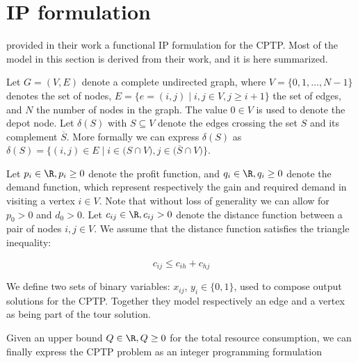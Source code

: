 \chapter{IP formulation}

\cite{Jepsen2014} provided in their work a functional IP formulation for the CPTP.
Most of the model in this section is derived from their work, and it is here summarized.

Let $G = \left(V, E \right)$ denote a complete undirected graph, where $V = \lbrace 0, 1, \dots, N - 1 \rbrace$ denotes the set of nodes,
$E = \lbrace  e = (i, j) \mid i,j \in V, j \ge i + 1 \rbrace$ the set of edges, and $N$ the number of nodes in the graph.
The value $0 \in V$ is used to denote the depot node.
Let $\delta(S)$ with $S \subseteq V$ denote the edges crossing the set $S$ and its complement $\overline{S}$.
More formally we can express $\delta(S)$ as $\delta(S) = \lbrace (i, j) \in E \mid i \in \lparen S \cap V \rparen, j \in \lparen \overline{S} \cap V \rparen \rbrace$.

Let $p_{i} \in \R, p_{i} \ge 0$ denote the profit function, and $q_{i} \in \R, q_{i} \ge 0$ denote the demand function, which represent respectively the gain and required demand in visiting a vertex $i \in V$.
Note that without loss of generality we can allow for $p_{0} > 0$ and $d_{0} > 0$.
Let $c_{ij} \in \R, c_{ij} > 0$ denote the distance function between a pair of nodes  $i, j \in V$.
We assume that the distance function satisfies the triangle inequality:

\begin{equation}
	c_{ij} \le c_{ih} + c_{hj}
\end{equation}

We define two sets of binary variables: $x_{ij}$, $y_{i} \in \lbrace 0, 1 \rbrace$, used to compose output solutions for the CPTP.
Together they model respectively an edge and a vertex as being part of the tour solution.

Given an upper bound $Q \in \R,Q \ge 0$ for the total resource consumption, we can finally express the CPTP problem as an integer programming formulation


